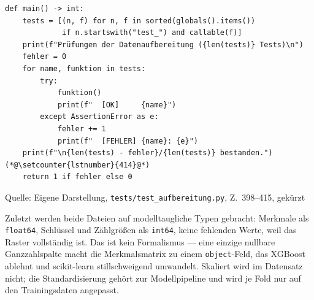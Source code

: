 \documentclass[12pt,a4paper]{article}
\newcommand{\tabquelle}[1][Eigene Darstellung]{%
  \par\setlength{\parskip}{0pt}\vspace{3pt}%
  {\setstretch{1}\fontsize{9pt}{11pt}\selectfont\raggedright Quelle: #1\par}%
}
\begin{document}
\begin{quellcode}[htbp]
\caption{Sammeln und Ausführen aller Prüfungen}
\label{lst:testlauf}\vspace{-3.5pt}
\begin{lstlisting}[style=pythonstil,firstnumber=398]
def main() -> int:
    tests = [(n, f) for n, f in sorted(globals().items())
             if n.startswith("test_") and callable(f)]
    print(f"Prüfungen der Datenaufbereitung ({len(tests)} Tests)\n")
    fehler = 0
    for name, funktion in tests:
        try:
            funktion()
            print(f"  [OK]     {name}")
        except AssertionError as e:
            fehler += 1
            print(f"  [FEHLER] {name}: {e}")
    print(f"\n{len(tests) - fehler}/{len(tests)} bestanden.")(*@\setcounter{lstnumber}{414}@*)
    return 1 if fehler else 0
\end{lstlisting}
\tabquelle[Eigene Darstellung, \texttt{tests/test\_aufbereitung.py}, Z.~398--415, gekürzt]
\end{quellcode}
 
Zuletzt werden beide Dateien auf modelltaugliche Typen gebracht: Merkmale als
\texttt{float64}, Schlüssel und Zählgrößen als \texttt{int64}, keine fehlenden
Werte, weil das Raster vollständig ist. Das ist
kein Formalismus --- eine einzige nullbare Ganzzahlspalte macht die
Merkmalsmatrix zu einem \texttt{object}-Feld, das XGBoost ablehnt und
scikit-learn stillschweigend umwandelt. Skaliert wird im Datensatz nicht; die
Standardisierung gehört zur Modellpipeline und wird je Fold nur auf den
Trainingsdaten angepasst.
 
\end{document}
